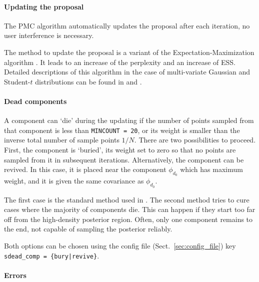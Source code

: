 \documentclass[11pt, chapterprefix, headsepline]{scrartcl}
\begin{document}
\paragraph{Updating the proposal}

The PMC algorithm automatically updates the proposal after each
iteration, no user interference is necessary.

The method to update the proposal is a variant of the
Expectation-Maximization algorithm
\citep[EM,][]{dempster:laird:rubin:1977}. It leads to an increase of
the perplexity and an increase of ESS. Detailed descriptions of this
algorithm in the case of multi-variate Gaussian and Student-$t$
distributions can be found in
\cite{cappe:douc:guillin:marin:robert:2007} and \cite{WK09}.

\paragraph{Dead components}

A component can `die' during the updating if the number of points
sampled from that component is less than \texttt{MINCOUNT = 20}, or
its weight is smaller than the inverse total number of sample points
$1/N$. There are two possibilities to proceed. First, the component is
`buried', its weight set to zero so that no points are sampled from it
in subsequent iterations. Alternatively, the component can be
revived. In this case, it is placed near the component $\phi_{d_0}$
which has maximum weight, and it is given the same covariance as
$\phi_{d_0}$.

The first case is the standard method used in \cite{WK09}. The second
method tries to cure cases where the majority of components die. This
can happen if they start too far off from the high-density posterior
region. Often, only one component remains to the end, not capable of
sampling the posterior reliably.

Both options can be chosen using the config file
(Sect.~\ref{sec:config_file}) key
\texttt{sdead\_comp = \{bury|revive\}}.

\paragraph{Errors}
\label{sec:errors}
\end{document}
